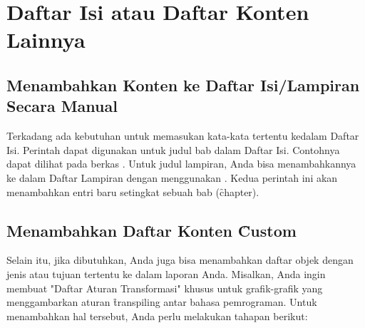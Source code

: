 \section{Daftar Isi atau Daftar Konten Lainnya}
\label{sec:tableOfContent}


\subsection{Menambahkan Konten ke Daftar Isi/Lampiran Secara Manual}
\label{sec:addTocEntry}
Terkadang ada kebutuhan untuk memasukan kata-kata tertentu kedalam Daftar Isi. Perintah  dapat digunakan untuk judul bab dalam Daftar Isi. Contohnya dapat dilihat pada berkas . Untuk judul lampiran, Anda bisa menambahkannya ke dalam Daftar Lampiran dengan menggunakan . Kedua perintah ini akan menambahkan entri baru setingkat sebuah bab (\f{chapter}).


\subsection{Menambahkan Daftar Konten \f{Custom}}
\label{sec:addCustomContentList}
Selain itu, jika dibutuhkan, Anda juga bisa menambahkan daftar objek dengan jenis atau tujuan tertentu ke dalam laporan Anda. Misalkan, Anda ingin membuat "Daftar Aturan Transformasi" khusus untuk grafik-grafik yang menggambarkan aturan \f{transpiling} antar bahasa pemrograman. Untuk menambahkan hal tersebut, Anda perlu melakukan tahapan berikut:

